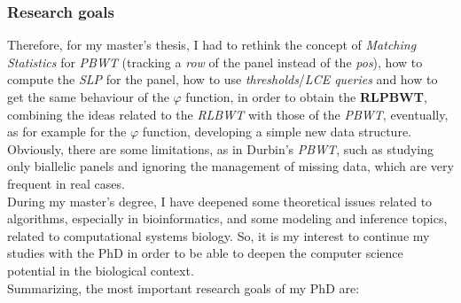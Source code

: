 \documentclass[a4paper,11pt, oneside]{article}
\begin{document}
\subsubsection*{Research goals}
Therefore, for my master's thesis, I had to rethink the concept of
\textit{Matching Statistics} for \textit{PBWT} (tracking  a \textit{row} of the
panel instead of the \textit{pos}), how to compute the \textit{SLP}
for the panel, how to use \textit{thresholds}/\textit{LCE queries} and how to
get the same behaviour of the $\varphi$ function, in order to obtain the
\textbf{RLPBWT}, combining the ideas related to the \textit{RLBWT} with those of
the \textit{PBWT}, eventually, as for example for the $\varphi$ function,
developing a simple new data structure.
Obviously, there are some limitations, as in Durbin's \textit{PBWT}, such as
studying only biallelic panels and ignoring the management of missing data,
which are very frequent in real cases. \\
During my master’s degree, I have deepened some theoretical
issues related to algorithms, especially in bioinformatics, and
some modeling and inference topics, related to computational 
systems biology. So, it is my interest to continue my studies with the PhD
in order to be able to deepen the computer science potential in the biological
context.\\
Summarizing, the most important research goals of my PhD are:
\end{document}
